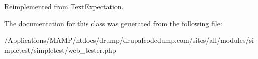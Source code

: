 Reimplemented from \hyperlink{class_text_expectation_ab76e87201a16eb23fbb1fbafc24b51cf}{TextExpectation}.

The documentation for this class was generated from the following file:\begin{DoxyCompactItemize}
\item 
/Applications/MAMP/htdocs/drump/drupalcodedump.com/sites/all/modules/simpletest/simpletest/web\_\-tester.php\end{DoxyCompactItemize}
